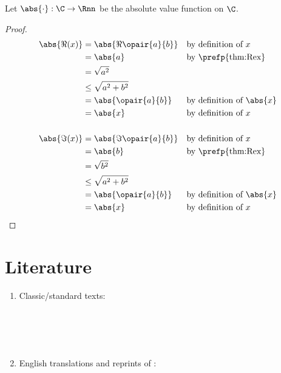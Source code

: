 \begin{theorem}
Let $\abs{\cdot}:\C\to\Rnn$ be the absolute value function on $\C$.
\end{theorem}
\begin{proof}
\begin{align*}
  \abs{\Re(x)}
    &= \abs{\Re\opair{a}{b}}
    && \text{by definition of $x$}
  \\&= \abs{a}
    && \text{by \prefp{thm:Rex}}
  \\&= \sqrt{a^2}
  \\&\le \sqrt{a^2+b^2}
  \\&= \abs{\opair{a}{b}}
    && \text{by definition of $\abs{x}$}
  \\&= \abs{x}
    && \text{by definition of $x$}
  \\
  \\
  \abs{\Im(x)}
    &= \abs{\Im\opair{a}{b}}
    && \text{by definition of $x$}
  \\&= \abs{b}
    && \text{by \prefp{thm:Rex}}
  \\&= \sqrt{b^2}
  \\&\le \sqrt{a^2+b^2}
  \\&= \abs{\opair{a}{b}}
    && \text{by definition of $\abs{x}$}
  \\&= \abs{x}
    && \text{by definition of $x$}
\end{align*}
\end{proof}


\section{Literature}
\begin{survey}
\begin{enumerate}
  \item Classic/standard texts: \label{lit:numsys_classic}
    \\
    \\
    \\
    \\
    \\

  \item English translations and reprints of :
    \\
    \\
    \\
    \\
    \\
    \\
\end{enumerate}
\end{survey}